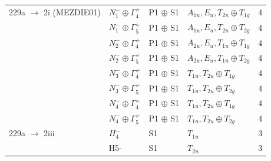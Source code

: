 \documentclass[preprint]{iucr}              %
\begin{document}
\begin{table}
\begin{tabular}{lllll}
229a $\rightarrow$ 2i (MEZDIE01) & $N_1^-\oplus\Gamma_4^+$ &
P1 $\oplus$ S1 & $A_{1u},E_u,T_{2u} \oplus T_{1g}$ & 4\\
& $N_1^-\oplus\Gamma_5^+$ & P1 $\oplus$ S1 & $A_{1u},E_u,T_{2u}
\oplus T_{2g}$ & 4\\
& $N_2^-\oplus\Gamma_4^+$ & P1 $\oplus$ S1 & $A_{2u},E_u,T_{1u}
\oplus T_{1g}$ & 4 \\
& $N_2^-\oplus\Gamma_5^+$ & P1 $\oplus$ S1 & $A_{2u},E_u,T_{1u}
\oplus T_{2g}$ & 4 \\
& $N_3^-\oplus\Gamma_4^+$ & P1 $\oplus$ S1 & $T_{1u},T_{2u} \oplus
T_{1g}$ & 4\\
& $N_3^-\oplus\Gamma_5^+$ & P1 $\oplus$ S1 & $T_{1u},T_{2u} \oplus
T_{2g}$ & 4\\
& $N_4^-\oplus\Gamma_4^+$ & P1 $\oplus$ S1 & $T_{1u},T_{2u} \oplus
T_{1g}$ & 4\\
& $N_4^-\oplus\Gamma_5^+$ & P1 $\oplus$ S1 & $T_{1u},T_{2u} \oplus
T_{2g}$ & 4\\

229a $\rightarrow$ 2iii & $H_4^-$ & S1 & $T_{1u}$ & 3\\
& H5- & S1 & $T_{2u}$ & 3\\
\hline
\end{tabular}
\end{table}
\end{document}
